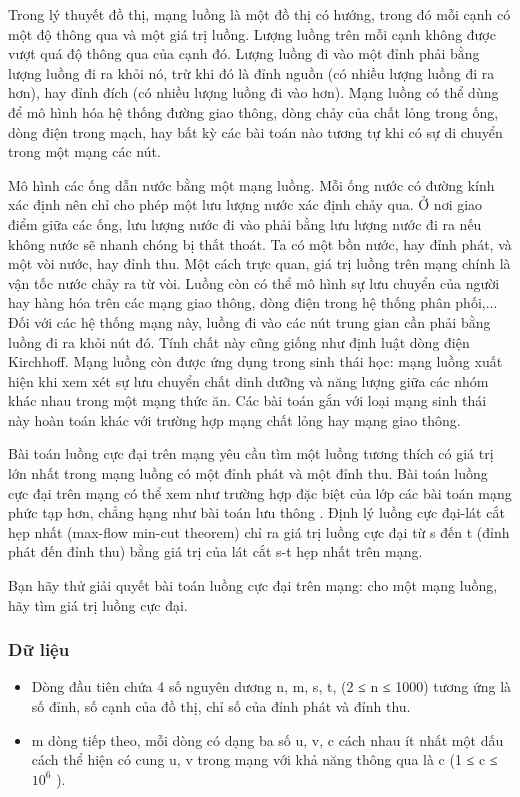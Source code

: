 



   Trong lý thuyết đồ thị,   mạng luồng   là một đồ thị có hướng, trong đó mỗi cạnh có một độ thông qua và một giá trị luồng. Lượng luồng trên mỗi cạnh không được vượt quá độ thông qua của cạnh đó.   Lượng luồng đi vào một đỉnh phải bằng lượng luồng đi ra khỏi nó, trừ khi đó là đỉnh nguồn (có nhiều lượng luồng đi ra hơn), hay đỉnh đích (có nhiều lượng luồng đi vào hơn). Mạng luồng có thể dùng để mô   hình hóa hệ thống đường giao thông, dòng chảy của chất lỏng trong ống, dòng điện trong mạch, hay bất kỳ các bài toán nào tương tự khi có sự di chuyển trong một mạng các nút.  

   Mô hình các ống dẫn nước bằng một mạng luồng. Mỗi ống nước có đường kính xác định nên chỉ cho phép một lưu lượng nước xác định chảy qua. Ở nơi giao điểm giữa các ống, lưu lượng nước đi vào   phải bằng lưu lượng nước đi ra nếu không nước sẽ nhanh chóng bị thất thoát. Ta có một bồn nước, hay đỉnh phát, và một vòi nước, hay đỉnh thu. Một cách trực quan, giá trị luồng trên mạng chính là vận tốc   nước chảy ra từ vòi. Luồng còn có thể mô hình sự lưu chuyển của người hay hàng hóa trên các mạng giao thông, dòng điện trong hệ thống phân phối,... Đối với các hệ thống mạng này, luồng đi vào các nút   trung gian cần phải bằng luồng đi ra khỏi nút đó. Tính chất này cũng giống như định luật dòng điện Kirchhoff. Mạng luồng còn được ứng dụng trong sinh thái học: mạng luồng xuất hiện khi xem xét sự lưu   chuyển chất dinh dưỡng và năng lượng giữa các nhóm khác nhau trong một mạng thức ăn. Các bài toán gắn với loại mạng sinh thái này hoàn toán khác với trường hợp mạng chất lỏng hay mạng giao thông.  

   Bài toán   luồng cực đại trên mạng   yêu cầu tìm một luồng tương thích có giá trị lớn nhất trong mạng luồng có một đỉnh phát và một đỉnh thu. Bài toán luồng cực đại trên mạng có thể xem như trường   hợp đặc biệt của lớp các bài toán mạng phức tạp hơn, chẳng hạng như bài toán   lưu thông   . Định lý luồng cực đại-lát cắt hẹp nhất (max-flow min-cut theorem) chỉ ra giá trị luồng cực đại từ s đến t (đỉnh   phát đến đỉnh thu) bằng giá trị của lát cắt s-t hẹp nhất trên mạng.  

   Bạn hãy thử giải quyết bài toán luồng cực đại trên mạng: cho một mạng luồng, hãy tìm giá trị luồng cực đại.  

\subsubsection{   Dữ liệu  }
\begin{itemize}
	\item     Dòng đầu tiên chứa 4 số nguyên dương n, m, s, t, (2 ≤ n ≤ 1000) tương ứng là số đỉnh, số cạnh của đồ thị, chỉ số của đỉnh phát và đỉnh thu.   
	\item     m dòng tiếp theo, mỗi dòng có dạng ba số u, v, c cách nhau ít nhất một dấu cách thể hiện có cung u, v trong mạng với khả năng thông qua là c (1 ≤ c ≤ $10^{6}$    ).   
\end{itemize}

